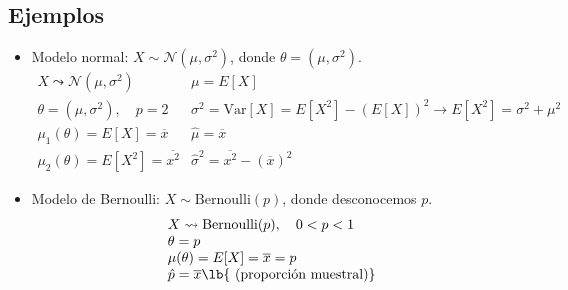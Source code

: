 \subsection*{Ejemplos}
\begin{tcolorbox}[colback=red!5!white, colframe=red!75!black, title=\textbf{Calculad los estimadores usando el método de los momentos en los dos casos:}]
\begin{itemize}[label=\textbullet]
    \item Modelo normal: $X\sim \mathcal{N}(\mu, \sigma^2)$, donde $\theta=(\mu,\sigma^2)$. \[
    \begin{array}{ll}
        X\leadsto \mathcal{N}(\mu,\sigma^2) & \mu=E[X]\\
        \theta=(\mu,\sigma^2),\quad p=2 & \sigma^2=\mathrm{Var}[X]=E[X^2]-(E[X])^2\longrightarrow E[X^2]=\sigma^2+\mu^2\\
        \mu_1(\theta)=E[X]=\overline{x} & \hat{\mu}=\overline{x}\\
        \mu_2(\theta)=E[X^2]=\overline{x^2} & \hat{\sigma}^2=\overline{x^2}-(\overline{x})^2
    \end{array}
    \] 
\item Modelo de Bernoulli: $X\sim \mathrm{Bernoulli}(p)$, donde desconocemos $p$.
     \[
    \begin{array}{l}
        X\leadsto \mathrm{Bernoulli}(p),\quad 0<p<1\\
        \theta=p\\
        \mu(\theta)=E[X]=\overline{x}=p\\
        \hat{p}=\overline{x}\lb{\text{ (proporción muestral)}} 
    \end{array}
    \] 
\end{itemize}
\end{tcolorbox}
